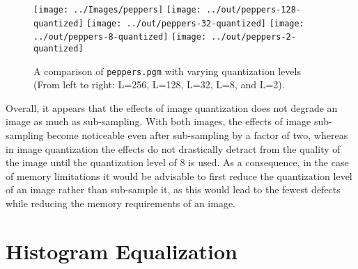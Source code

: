 \documentclass[headings=optiontoheadandtoc,listof=totoc,parskip=full]{scrartcl}
\begin{document}
\begin{figure}[ht]
	\centering
	\texttt{[image: ../Images/peppers]}
	\texttt{[image: ../out/peppers-128-quantized]}
	\texttt{[image: ../out/peppers-32-quantized]}
	\texttt{[image: ../out/peppers-8-quantized]}
	\texttt{[image: ../out/peppers-2-quantized]}
	\caption{A comparison of \texttt{peppers.pgm} with varying quantization levels (From left to right: L=256, L=128, L=32, L=8, and L=2).}
	\label{fig:quantize-result-2}
\end{figure}

Overall, it appears that the effects of image quantization does not degrade an image as much as sub-sampling. With both images, the effects of image sub-sampling become noticeable even after sub-sampling by a factor of two, whereas in image quantization the effects do not drastically detract from the quality of the image until the quantization level of 8 is used. As a consequence, in the case of memory limitations it would be advisable to first reduce the quantization level of an image rather than sub-sample it, as this would lead to the fewest defects while reducing the memory requirements of an image.

\section{Histogram Equalization}
\label{sec:equalization}
\end{document}
